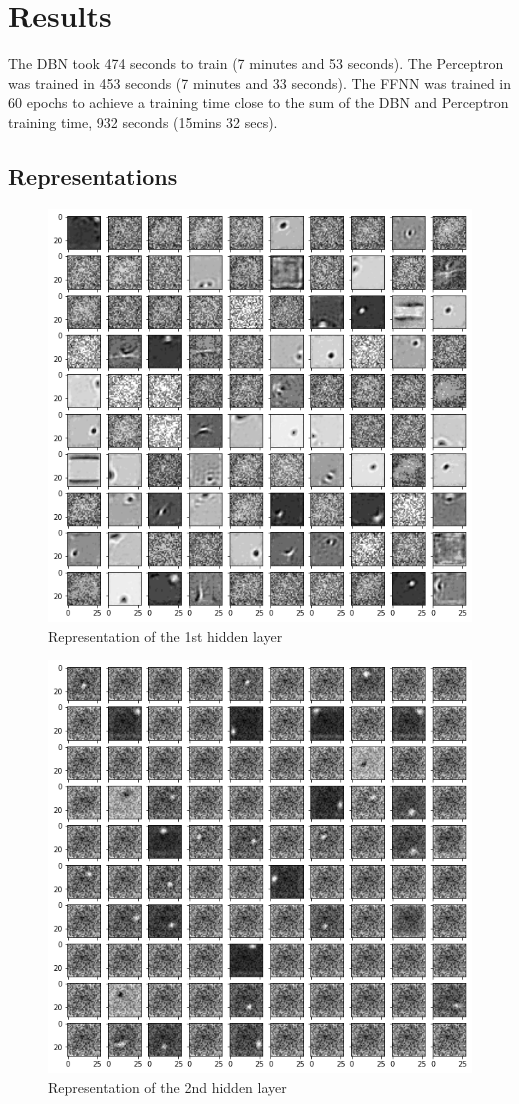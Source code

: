 \documentclass[a4paper, 11pt]{article}
\begin{document}
		
		
		
		
		
		
		
	\section{Results}	
			The DBN took 474 seconds to train (7 minutes and 53 seconds).
			The Perceptron was trained in 453 seconds (7 minutes and 33 seconds).
			The FFNN was trained in 60 epochs to achieve a training time close to the sum of the DBN and Perceptron training time, 932 seconds (15mins 32 secs).
			
			
	
	
		\subsection{Representations}
			
			\begin{figure}[H]
				\centering
				\includegraphics[width=.7\linewidth]{0.1_1.png}  
				\caption{Representation of the 1st hidden layer}
				\label{fig:rep1}
			\end{figure}
			
			\begin{figure}[H]
				\centering
				\includegraphics[width=.7\linewidth]{0.1_2.png}  
				\caption{Representation of the 2nd hidden layer}
				\label{fig:rep2}
			\end{figure}
			
\end{document}
